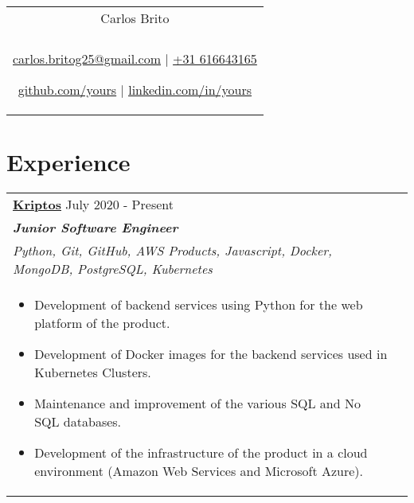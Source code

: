 \documentclass[a4paper,8pt]{article}
\begin{document}
\pagestyle{empty} 


\begin{tabularx}{\linewidth}{@{} C @{}}
\color[HTML]{1C033C} \Huge{Carlos Brito} \\[6pt]
\\
\textcolor[HTML]{371e77}{\underline{\href{mailto:your@email.com}{\raisebox{-0.05\height}{\faEnvelope} carlos.britog25@gmail.com}} $|$}
\textcolor[HTML]{371e77}{\href{tel:+525513219900}{\raisebox{-0.05\height}{\faMobile} +31 616643165}}

\textcolor[HTML]{371e77}{\underline{\href{https://github.com/yours}{\raisebox{-0.05\height}{\faGithub} github.com/yours}} $|$}
\textcolor[HTML]{371e77}{\underline{\href{https://linkedin.com/in/yours}{\raisebox{-0.05\height}{\faLinkedin} linkedin.com/in/yours}}}
\end{tabularx}

\section{Experience}
\begin{tabularx}{\linewidth}{ @{}l r@{} }
\textbf{\uline{\href{https://www.kriptos.io/en/home}{Kriptos}}} \hfill \color[HTML]{371e77} July 2020 - Present \\[4pt]
\color[HTML]{371e77}\textbf{\textit{Junior Software Engineer}}\ \hfill \color[HTML]{4B28A4} \\ \textit{Python, Git, GitHub, AWS Products, Javascript, Docker, MongoDB, PostgreSQL, Kubernetes} \\[5pt]
\begin{minipage}[t]{\linewidth}
    \begin{itemize}[nosep,after=\strut, leftmargin=2em, itemsep=2pt]
        \item Development of backend services using Python for the web platform of the product.
        \item Development of Docker images for the backend services used in Kubernetes Clusters.
        \item Maintenance and improvement of the various SQL and No SQL databases.
        \item Development of the infrastructure of the product in a cloud environment (Amazon Web Services and Microsoft Azure).
    \end{itemize}
\end{minipage}
\end{tabularx}
\end{document}
